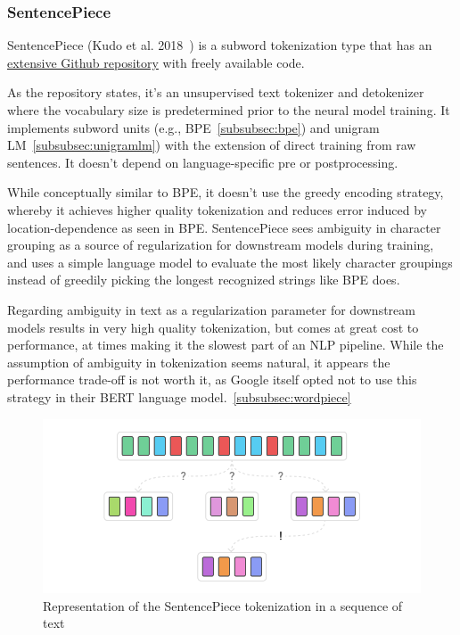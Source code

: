\subsubsection{SentencePiece}

SentencePiece (Kudo et al. 2018~\cite{kudo2018sentencepiece}) is a subword tokenization type that has an \href{https://github.com/google/sentencepiece}{extensive Github repository} with freely available code.

As the repository states, it's an unsupervised text tokenizer and detokenizer where the vocabulary size is predetermined prior to the neural model training. It implements subword units (e.g., BPE~\ref{subsubsec:bpe}) and unigram LM~\ref{subsubsec:unigramlm}) with the extension of direct training from raw sentences. It doesn't depend on language-specific pre or postprocessing.

While conceptually similar to BPE, it doesn't use the greedy encoding strategy, whereby it achieves higher quality tokenization and reduces error induced by location-dependence as seen in BPE. SentencePiece sees ambiguity in character grouping as a source of regularization for downstream models during training, and uses a simple language model to evaluate the most likely character groupings instead of greedily picking the longest recognized strings like BPE does.

Regarding ambiguity in text as a regularization parameter for downstream models results in very high quality tokenization, but comes at great cost to performance, at times making it the slowest part of an NLP pipeline. While the assumption of ambiguity in tokenization seems natural, it appears the performance trade-off is not worth it, as Google itself opted not to use this strategy in their BERT language model.~\ref{subsubsec:wordpiece}

\begin{figure}[!ht]
    \centering
    \includegraphics[width=14cm]{figures/sentencepiece.png}
    \caption{Representation of the SentencePiece tokenization in a sequence of text}
\end{figure}

